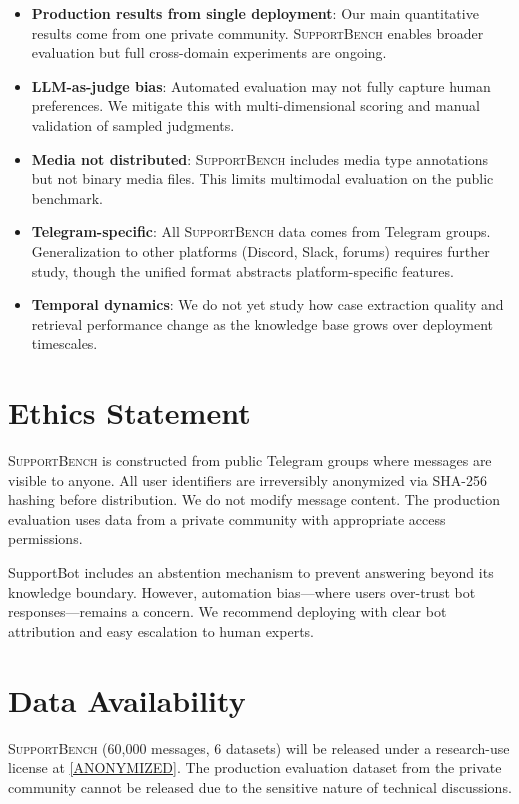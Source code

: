 \documentclass[11pt]{article}
\newcommand{\supportbench}{\textsc{SupportBench}}
\begin{document}
\begin{itemize}
    \item \textbf{Production results from single deployment}: Our main quantitative results come from one private community. \supportbench{} enables broader evaluation but full cross-domain experiments are ongoing.
    \item \textbf{LLM-as-judge bias}: Automated evaluation may not fully capture human preferences. We mitigate this with multi-dimensional scoring and manual validation of sampled judgments.
    \item \textbf{Media not distributed}: \supportbench{} includes media type annotations but not binary media files. This limits multimodal evaluation on the public benchmark.
    \item \textbf{Telegram-specific}: All \supportbench{} data comes from Telegram groups. Generalization to other platforms (Discord, Slack, forums) requires further study, though the unified format abstracts platform-specific features.
    \item \textbf{Temporal dynamics}: We do not yet study how case extraction quality and retrieval performance change as the knowledge base grows over deployment timescales.
\end{itemize}

\section*{Ethics Statement}

\supportbench{} is constructed from public Telegram groups where messages are visible to anyone. All user identifiers are irreversibly anonymized via SHA-256 hashing before distribution. We do not modify message content. The production evaluation uses data from a private community with appropriate access permissions.

SupportBot includes an abstention mechanism to prevent answering beyond its knowledge boundary. However, automation bias---where users over-trust bot responses---remains a concern. We recommend deploying with clear bot attribution and easy escalation to human experts.

\section*{Data Availability}

\supportbench{} (60{,}000 messages, 6 datasets) will be released under a research-use license at \url{[ANONYMIZED]}. The production evaluation dataset from the private community cannot be released due to the sensitive nature of technical discussions.


\end{document}
